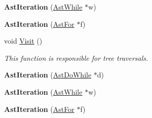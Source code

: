 \begin{DoxyCompactItemize}
\item 
\hypertarget{classAstIteration_aed79cf13c2e6376cab0a02b657ef6c87}{{\bfseries Ast\-Iteration} (\hyperlink{classAstWhile}{Ast\-While} $\ast$w)}\label{classAstIteration_aed79cf13c2e6376cab0a02b657ef6c87}

\item 
\hypertarget{classAstIteration_a87f1eaa5c3fc5b4562cbad3e54ff5061}{{\bfseries Ast\-Iteration} (\hyperlink{classAstFor}{Ast\-For} $\ast$f)}\label{classAstIteration_a87f1eaa5c3fc5b4562cbad3e54ff5061}

\item 
void \hyperlink{classAstIteration_ae3e90f781890621279ff29b5481e0d4b}{Visit} ()
\begin{DoxyCompactList}\small\item\em This function is responsible for tree traversals. \end{DoxyCompactList}\item 
\hypertarget{classAstIteration_a9b98ddbdb8795a514c129a86fc00b561}{{\bfseries Ast\-Iteration} (\hyperlink{classAstDoWhile}{Ast\-Do\-While} $\ast$d)}\label{classAstIteration_a9b98ddbdb8795a514c129a86fc00b561}

\item 
\hypertarget{classAstIteration_aed79cf13c2e6376cab0a02b657ef6c87}{{\bfseries Ast\-Iteration} (\hyperlink{classAstWhile}{Ast\-While} $\ast$w)}\label{classAstIteration_aed79cf13c2e6376cab0a02b657ef6c87}

\item 
\hypertarget{classAstIteration_a87f1eaa5c3fc5b4562cbad3e54ff5061}{{\bfseries Ast\-Iteration} (\hyperlink{classAstFor}{Ast\-For} $\ast$f)}\label{classAstIteration_a87f1eaa5c3fc5b4562cbad3e54ff5061}


\end{DoxyCompactItemize}
